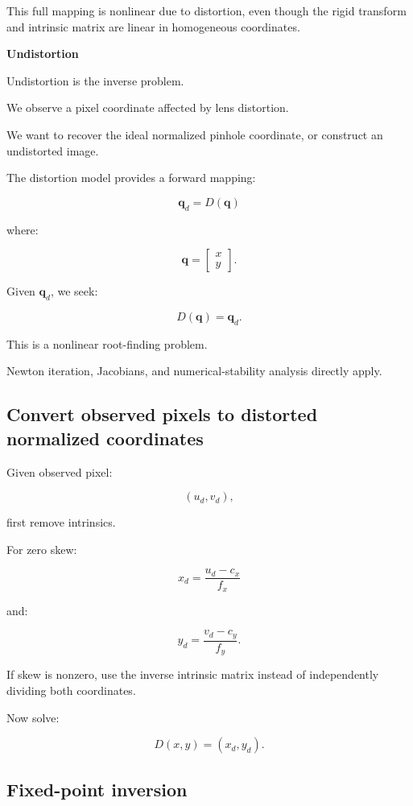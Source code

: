 This full mapping is nonlinear due to distortion, even though the rigid transform and intrinsic matrix are linear in homogeneous coordinates.

\textbf{Undistortion}

Undistortion is the inverse problem.

We observe a pixel coordinate affected by lens distortion.

We want to recover the ideal normalized pinhole coordinate, or construct an undistorted image.

The distortion model provides a forward mapping:

\[
 \boxed{ \mathbf q_d=D(\mathbf q) }
\]

where:

\[
 \mathbf q= \begin{bmatrix}x\\y\end{bmatrix}.
\]

Given \(\mathbf q_d\), we seek:

\[
 \boxed{ D(\mathbf q)=\mathbf q_d }.
\]

This is a nonlinear root-finding problem.

Newton iteration, Jacobians, and numerical-stability analysis directly apply.

\subsection{Convert observed pixels to distorted normalized coordinates}\label{02-foundations-ii-ch035-convert-observed-pixels-to-distorted-normalized-coordinates}

\hypertarget{02-foundations-ii-ch035-convert-observed-pixels-to-distorted-normalized-coordinates}{}

Given observed pixel:

\[
 (u_d,v_d),
\]

first remove intrinsics.

For zero skew:

\[
 \boxed{ x_d=\frac{u_d-c_x}{f_x} }
\]

and:

\[
 \boxed{ y_d=\frac{v_d-c_y}{f_y} }.
\]

If skew is nonzero, use the inverse intrinsic matrix instead of independently dividing both coordinates.

Now solve:

\[
 D(x,y)=(x_d,y_d).
\]

\subsection{Fixed-point inversion}\label{02-foundations-ii-ch035-fixed-point-inversion}

